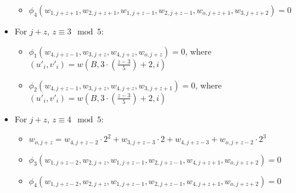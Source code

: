 \begin{itemize}
\begin{itemize}
        \item $\phi_4(w_{1, j + z + 1}, w_{2, j + z + 1}, w_{1, j + z - 1}, w_{2, j + z - 1}, w_{o, j + z + 1}, w_{3, j + z + 2}) = 0$
    \end{itemize}
    \item For $j + z$, $z \equiv 3 \mod 5$:
    \begin{itemize}
        \item $\phi_1(w_{4, j + z - 1}, w_{3, j + z}, w_{4, j + z}, w_{o, j + z}) = 0$, where $(u'_{i}, v'_{i}) = w(B, 3 \cdot (\frac{z - 3}{5}) + 2, i)$
        \item $\phi_2(w_{4, j + z - 1}, w_{3, j + z}, w_{4, j + z}, w_{3, j + z + 1}) = 0$, where $(u'_{i}, v'_{i}) = w(B, 3 \cdot (\frac{z - 3}{5}) + 2, i)$
    \end{itemize}
    \item For $j + z$, $z \equiv 4 \mod 5$:
    \begin{itemize}
        \item $w_{o, j + z} = w_{4,j + z - 2} \cdot 2^2 + w_{3,j + z - 3} \cdot 2 + w_{4, j + z - 3} + w_{o, j + z - 2} \cdot 2^3$
        \item $\phi_3(w_{1, j + z - 2}, w_{2, j + z}, w_{1, j + z - 1}, w_{2, j + z - 1}, w_{4, j + z + 1}, w_{o, j + z + 2}) = 0$
        \item $\phi_4(w_{1, j + z - 2}, w_{2, j + z}, w_{1, j + z - 1}, w_{2, j + z - 1}, w_{4, j + z + 1}, w_{o, j + z + 2}) = 0$
    \end{itemize}
\end{itemize}

